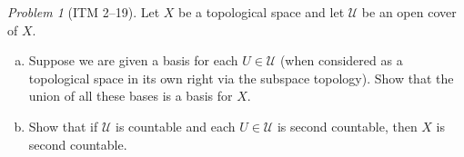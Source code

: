 \documentclass[11pt,twoside]{amsart}
\theoremstyle{plain}
\theoremstyle{remark}
\newtheorem{prob}{Problem}
\theoremstyle{definition}
\theoremstyle{definition}
\newcommand{\sU}{\mathscr{U}}
\begin{document}
\begin{prob}[ITM 2--19]
Let $X$ be a topological space and let $\sU$ be an open cover of $X$.
\begin{enumerate}[(a)]
\item Suppose we are given a basis for each $U\in \sU$ (when considered as a topological space in its own right via the subspace topology). Show that the union of all these bases is a basis for $X$.
\item Show that if $\sU$ is countable and each $U\in \sU$ is second countable, then $X$ is second countable.
\end{enumerate}
\end{prob}
\end{document}
